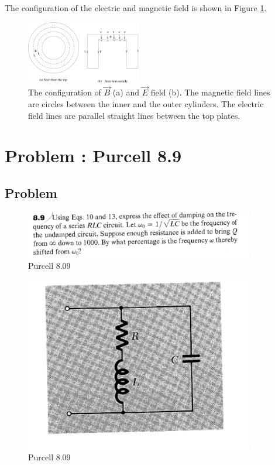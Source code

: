 \documentclass[solutions]{esg8022pset}
\begin{document}
The configuration of the electric and magnetic field is shown in
Figure \ref{fig:cavity2}.

\begin{figure}[H]
    \centering
    \includegraphics[width = 5cm]{cavity2}
    \caption{The configuration of $\vec{B}$ (a) and $\vec{E}$ field (b).
The magnetic field lines are circles between the inner and the outer
cylinders.  The electric field lines are parallel straight lines
between the top plates.}
    \label{fig:cavity2}
  \end{figure}


\section{Problem \thesection: Purcell 8.9}
\subsection{Problem}
\begin{figure}[H]
    \centering
    \includegraphics[width = 10cm]{pu809}
    \caption{Purcell 8.09}
  \end{figure}

  \begin{figure}[H]
    \centering
    \includegraphics[width = 10cm]{figpu809}
    \caption{Purcell 8.09}
  \end{figure}
\end{document}
